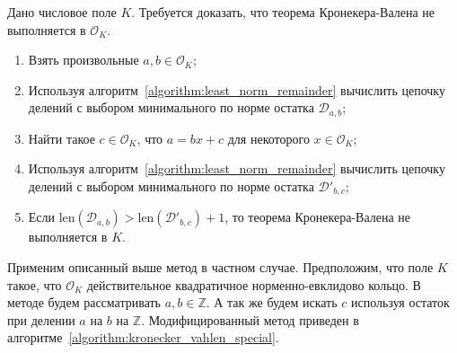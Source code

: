 \documentclass[_00_dissertation.tex]{subfiles}
\begin{document}
\begin{algorithm}\label{algorithm:kronecker_vahlen_common}
    Дано числовое поле $K$.
    Требуется доказать, что теорема Кронекера-Валена не выполняется в $\mathcal{O}_K$.
    
    \begin{enumerate}
        \item Взять произвольные $a, b \in \mathcal{O}_K$;

        \item Используя алгоритм~\ref{algorithm:least_norm_remainder} вычислить цепочку делений с выбором минимального по норме остатка $\mathcal{D}_{a, b}$;

        \item Найти такое $c \in \mathcal{O}_K$, что $a = bx + c$ для некоторого $x \in \mathcal{O}_K$;

        \item Используя алгоритм~\ref{algorithm:least_norm_remainder} вычислить цепочку делений с выбором минимального по норме остатка $\mathcal{D}'_{b,c}$;

        \item Если $\textrm{len}(\mathcal{D}_{a, b}) > \textrm{len}(\mathcal{D}'_{b, c}) + 1$, то теорема Кронекера-Валена не выполняется в $K$.
    \end{enumerate}
\end{algorithm}


Применим описанный выше метод в частном случае.
Предположим, что поле $K$ такое, что $\mathcal{O}_K$ действительное квадратичное норменно-евклидово кольцо.
В методе будем рассматривать $a, b \in \mathbb{Z}$.
А так же будем искать $c$ используя остаток при делении $a$ на $b$ на $\mathbb{Z}$.
Модифицированный метод приведен в алгоритме~\ref{algorithm:kronecker_vahlen_special}.
\end{document}
